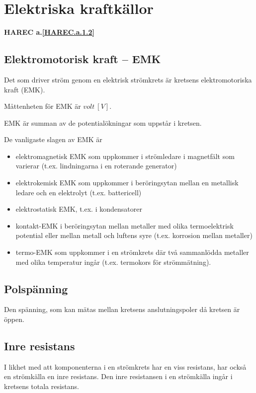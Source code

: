 \section{Elektriska kraftkällor}
\textbf{HAREC a.\ref{HAREC.a.1.2}\label{myHAREC.a.1.2}}

\subsection{Elektromotorisk kraft -- EMK}

Det som driver ström genom en elektrisk strömkrets är kretsens elektromotoriska
kraft (EMK).

Måttenheten för EMK är \(volt\ [V]\).

EMK är summan av de potentialökningar som uppstår i kretsen.

De vanligaste slagen av EMK är
\begin{itemize}
\item elektromagnetisk EMK som uppkommer i strömledare i magnetfält som
varierar (t.ex. lindningarna i en roterande generator)
\item elektrokemisk EMK som uppkommer i beröringsytan mellan en metallisk
ledare och en elektrolyt (t.ex. battericell)
\item elektrostatisk EMK, t.ex. i kondensatorer
\item kontakt-EMK i beröringsytan mellan metaller med olika termoelektrisk
potential eller mellan metall och luftens syre (t.ex. korrosion mellan metaller)
\item termo-EMK som uppkommer i en strömkrets där två sammanlödda metaller med
olika temperatur ingår (t.ex. termokors för strömmätning).
\end{itemize}

\subsection{Polspänning}

Den spänning, som kan mätas mellan kretsens anslutningspoler då kretsen är öppen.

\subsection{Inre resistans}

I likhet med att komponenterna i en strömkrets har en viss resistans, har också en
strömkälla en inre resistans.
Den inre resistansen i en strömkälla ingår i kretsens totala resistans.

